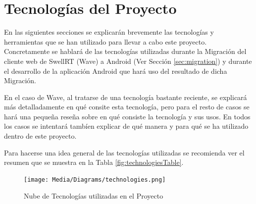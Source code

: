 \newpage
\thispagestyle{sectioned}
\chapter{Tecnologías del Proyecto}

En las siguientes secciones se explicarán brevemente las tecnologías y herramientas que se han utilizado para llevar a cabo este proyecto. Concretamente se hablará de las tecnologías utilizadas durante la Migración del cliente web de SwellRT (Wave) a Android (Ver Sección \ref{sec:migration}) y durante el desarrollo de la aplicación Android que hará uso del resultado de dicha Migración. 

En el caso de Wave, al tratarse de una tecnología bastante reciente, se explicará más detalladamente en qué consite esta tecnología, pero para el resto de casos se hará una pequeña reseña sobre en qué consiste la tecnología y sus usos. En todos los casos se intentará tambíen explicar de qué manera y para qué se ha utilizado dentro de este proyecto.

Para hacerse una idea general de las tecnologías utilizadas se recomienda ver el resumen que se muestra en la Tabla \ref{fig:technologiesTable}. 

	\begin{figure}[H]
	  \centering
	    \texttt{[image: Media/Diagrams/technologies.png]}
	  \caption{Nube de Tecnologías utilizadas en el Proyecto}
	  \label{fig:technologies}
	\end{figure}	
 
